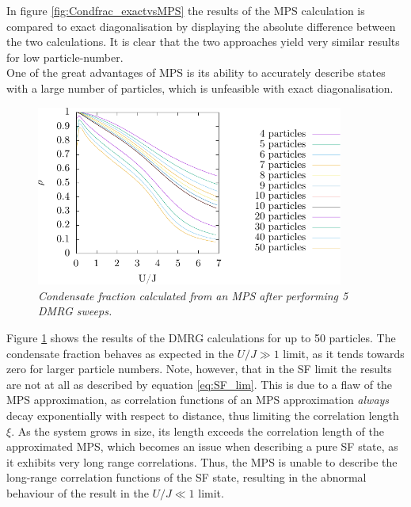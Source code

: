 In figure \ref{fig:Condfrac_exactvsMPS} the results of the MPS calculation is compared to exact diagonalisation by displaying the absolute difference between the two calculations. It is clear that the two approaches yield very similar results for low particle-number.\\
One of the great advantages of MPS is its ability to accurately describe states with a large number of particles, which is unfeasible with exact diagonalisation. 
\begin{figure}[h!]
	\centering
	\includegraphics[width=0.9\textwidth]{Figures/Condfrac_4to50.pdf}
	\caption{\textit{Condensate fraction calculated from an MPS after performing 5 DMRG sweeps.}}
	\label{fig:Condfrac_4to50}
\end{figure}
Figure \ref{fig:Condfrac_4to50} shows the results of the DMRG calculations for up to 50 particles. The condensate fraction behaves as expected in the $U/J \gg 1$ limit, as it tends towards zero for larger particle numbers. Note, however, that in the SF limit the results are not at all as described by equation \ref{eq:SF_lim}. This is due to a flaw of the MPS approximation, as correlation functions of an MPS approximation \textit{always} decay exponentially with respect to distance, thus limiting the correlation length $\xi$. As the system grows in size, its length exceeds the correlation length of the approximated MPS, which becomes an issue when describing a pure SF state, as it exhibits very long range correlations. Thus, the MPS is unable to describe the long-range correlation functions of the SF state, resulting in the abnormal behaviour of the result in the $U/J \ll 1$ limit.

